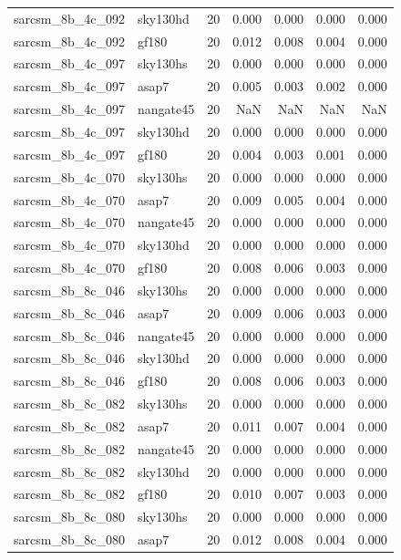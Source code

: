 \begin{tabular}{llrrrrr}
sarcsm\_8b\_4c\_092 & sky130hd & 20 & 0.000 & 0.000 & 0.000 & 0.000 \\
sarcsm\_8b\_4c\_092 & gf180 & 20 & 0.012 & 0.008 & 0.004 & 0.000 \\
sarcsm\_8b\_4c\_097 & sky130hs & 20 & 0.000 & 0.000 & 0.000 & 0.000 \\
sarcsm\_8b\_4c\_097 & asap7 & 20 & 0.005 & 0.003 & 0.002 & 0.000 \\
sarcsm\_8b\_4c\_097 & nangate45 & 20 & NaN & NaN & NaN & NaN \\
sarcsm\_8b\_4c\_097 & sky130hd & 20 & 0.000 & 0.000 & 0.000 & 0.000 \\
sarcsm\_8b\_4c\_097 & gf180 & 20 & 0.004 & 0.003 & 0.001 & 0.000 \\
sarcsm\_8b\_4c\_070 & sky130hs & 20 & 0.000 & 0.000 & 0.000 & 0.000 \\
sarcsm\_8b\_4c\_070 & asap7 & 20 & 0.009 & 0.005 & 0.004 & 0.000 \\
sarcsm\_8b\_4c\_070 & nangate45 & 20 & 0.000 & 0.000 & 0.000 & 0.000 \\
sarcsm\_8b\_4c\_070 & sky130hd & 20 & 0.000 & 0.000 & 0.000 & 0.000 \\
sarcsm\_8b\_4c\_070 & gf180 & 20 & 0.008 & 0.006 & 0.003 & 0.000 \\
sarcsm\_8b\_8c\_046 & sky130hs & 20 & 0.000 & 0.000 & 0.000 & 0.000 \\
sarcsm\_8b\_8c\_046 & asap7 & 20 & 0.009 & 0.006 & 0.003 & 0.000 \\
sarcsm\_8b\_8c\_046 & nangate45 & 20 & 0.000 & 0.000 & 0.000 & 0.000 \\
sarcsm\_8b\_8c\_046 & sky130hd & 20 & 0.000 & 0.000 & 0.000 & 0.000 \\
sarcsm\_8b\_8c\_046 & gf180 & 20 & 0.008 & 0.006 & 0.003 & 0.000 \\
sarcsm\_8b\_8c\_082 & sky130hs & 20 & 0.000 & 0.000 & 0.000 & 0.000 \\
sarcsm\_8b\_8c\_082 & asap7 & 20 & 0.011 & 0.007 & 0.004 & 0.000 \\
sarcsm\_8b\_8c\_082 & nangate45 & 20 & 0.000 & 0.000 & 0.000 & 0.000 \\
sarcsm\_8b\_8c\_082 & sky130hd & 20 & 0.000 & 0.000 & 0.000 & 0.000 \\
sarcsm\_8b\_8c\_082 & gf180 & 20 & 0.010 & 0.007 & 0.003 & 0.000 \\
sarcsm\_8b\_8c\_080 & sky130hs & 20 & 0.000 & 0.000 & 0.000 & 0.000 \\
sarcsm\_8b\_8c\_080 & asap7 & 20 & 0.012 & 0.008 & 0.004 & 0.000 \\

\end{tabular}

